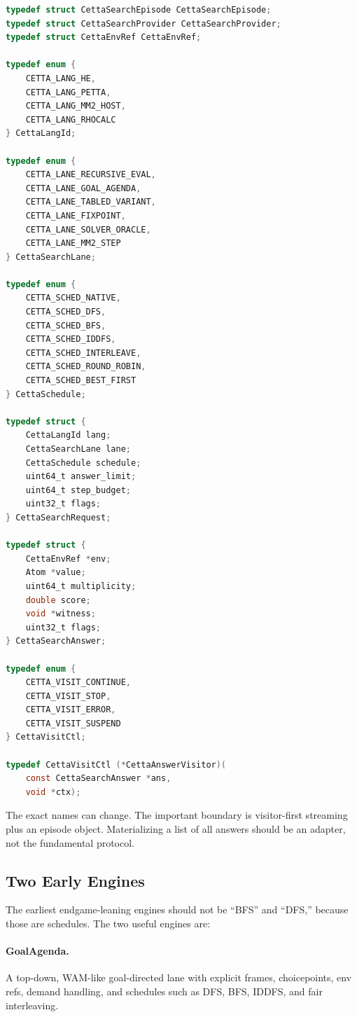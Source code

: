 \documentclass[11pt]{article}
\begin{document}
\begin{lstlisting}[language=C]
typedef struct CettaSearchEpisode CettaSearchEpisode;
typedef struct CettaSearchProvider CettaSearchProvider;
typedef struct CettaEnvRef CettaEnvRef;

typedef enum {
    CETTA_LANG_HE,
    CETTA_LANG_PETTA,
    CETTA_LANG_MM2_HOST,
    CETTA_LANG_RHOCALC
} CettaLangId;

typedef enum {
    CETTA_LANE_RECURSIVE_EVAL,
    CETTA_LANE_GOAL_AGENDA,
    CETTA_LANE_TABLED_VARIANT,
    CETTA_LANE_FIXPOINT,
    CETTA_LANE_SOLVER_ORACLE,
    CETTA_LANE_MM2_STEP
} CettaSearchLane;

typedef enum {
    CETTA_SCHED_NATIVE,
    CETTA_SCHED_DFS,
    CETTA_SCHED_BFS,
    CETTA_SCHED_IDDFS,
    CETTA_SCHED_INTERLEAVE,
    CETTA_SCHED_ROUND_ROBIN,
    CETTA_SCHED_BEST_FIRST
} CettaSchedule;

typedef struct {
    CettaLangId lang;
    CettaSearchLane lane;
    CettaSchedule schedule;
    uint64_t answer_limit;
    uint64_t step_budget;
    uint32_t flags;
} CettaSearchRequest;

typedef struct {
    CettaEnvRef *env;
    Atom *value;
    uint64_t multiplicity;
    double score;
    void *witness;
    uint32_t flags;
} CettaSearchAnswer;

typedef enum {
    CETTA_VISIT_CONTINUE,
    CETTA_VISIT_STOP,
    CETTA_VISIT_ERROR,
    CETTA_VISIT_SUSPEND
} CettaVisitCtl;

typedef CettaVisitCtl (*CettaAnswerVisitor)(
    const CettaSearchAnswer *ans,
    void *ctx);
\end{lstlisting}

The exact names can change.  The important boundary is visitor-first streaming plus an episode object.  Materializing a list of all answers should be an adapter, not the fundamental protocol.

\subsection{Two Early Engines}

The earliest endgame-leaning engines should not be ``BFS'' and ``DFS,'' because those are schedules.  The two useful engines are:

\paragraph{GoalAgenda.}  A top-down, WAM-like goal-directed lane with explicit frames, choicepoints, env refs, demand handling, and schedules such as DFS, BFS, IDDFS, and fair interleaving.
\end{document}
